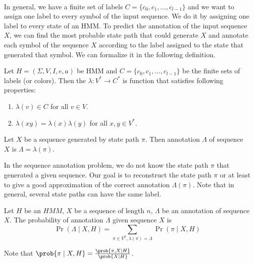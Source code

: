 \paragraph{} In general,
we have a finite set of labels $C=\{c_0,c_1,\dots,c_{l-1}\}$ and we want to
assign one label to every symbol of the input sequence. We do it by assigning
one label to every state of an HMM.
To predict the annotation of the input sequence $X$, we can  find the
most probable state path that could generate $X$ and  annotate each symbol of
the sequence $X$ according to the label assigned to the state that generated that
symbol. We can formalize it in the following definition.

\begin{definition}\label{DEFINITION:ANNOTATION}
Let $H=(\Sigma,V,I,e,a)$ be HMM and $C=\{c_0,c_1,\dots,c_{l-1}\}$ be the finite
sets of labels (or colors). Then the  
$\lambda: V^*\to C^*$ is function that satisfies following properties:
\begin{enumerate}[itemsep=-1mm]
\item $\lambda(v)\in C$ for all $v\in V$.
\item $\lambda(xy) = \lambda(x)\lambda(y)$ for all $x,y\in V^*$.
\end{enumerate}

Let $X$ be a sequence generated by state path $\pi$. Then annotation
$\Lambda$ of sequence $X$ is $\Lambda = \lambda(\pi)$.
\end{definition}

In the sequence annotation problem, we do not know the state path $\pi$ that
generated a given sequence. Our goal is to reconstruct the state path $\pi$ or
at least to give a good approximation of the correct annotation $\Lambda(\pi)$.
Note that in general, several state paths can have the same label.

\begin{definition}
Let $H$ be an $HMM$, $X$ be a sequence of length $n$, $\Lambda$ be an annotation of sequence
$X$. The probability of annotation $\Lambda$ given sequence $X$ is 
\begin{equation}
\Pr\left(\Lambda\mid X,H\right)=\sum_{\pi \in V^n,\lambda(\pi) =
\Lambda}\Pr\left(\pi\mid X,H \right)\label{DEF:ANNOTATION:PROBABILITY}
\end{equation}
\end{definition}

Note that $\prob{\pi\mid X,H}=\frac{\prob{\pi,X\mid H}}{\prob{X\mid
H}}$.

